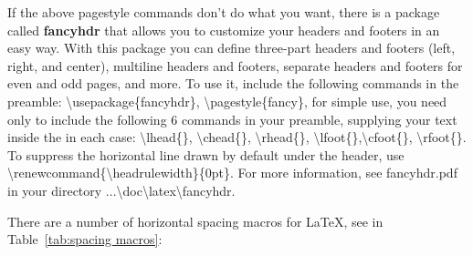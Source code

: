 \documentclass[a4paper,11pt,UTF8,openright]{book}
\begin{document}
If the above pagestyle commands don’t do what you want, there is a package called \textbf{fancyhdr} that allows you to customize your headers and footers in an easy way. With
this package you can define three-part headers and footers (left, right, and center), multiline headers and footers, separate headers and footers for even and odd pages, and more.
To use it, include the following commands in the preamble: \textbackslash usepackage\{fancyhdr\}, \textbackslash pagestyle\{fancy\}, for simple use, you need only to include the following 6 commands in your preamble, supplying your text inside the {} in each case: \textbackslash lhead\{\}, \textbackslash chead\{\}, \textbackslash rhead\{\}, \textbackslash lfoot\{\},\textbackslash cfoot\{\}, \textbackslash rfoot\{\}. To suppress the horizontal line drawn by default under the header, use \textbackslash renewcommand\{\textbackslash headrulewidth\}\{0pt\}. For more information, see fancyhdr.pdf in your directory ...\textbackslash doc\textbackslash latex\textbackslash fancyhdr.

\noindent There are a number of horizontal spacing macros for \LaTeX, see in Table~\ref{tab:spacing macros}:
\end{document}
